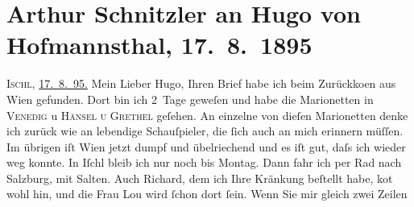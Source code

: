 

         
         \renewcommand{\erwaehntePersonen}{Personen: Lou Andreas-Salomé, Richard Beer-Hofmann, Paul Goldmann, Hugo von Hofmannsthal, Fedor Mamroth, Felix Salten}
         \renewcommand{\erwaehnteOrte}{Orte: Bad Ischl, Hodonín, München, Salzburg, Venedig in Wien, Wien}
         \renewcommand{\erwaehnteWerke}{Werke: Die Frau des Weisen. Erzählung, Ein Abschied, Freiwild. Schauspiel in 3 Akten, Hänsel und Grethel}
               \section[Arthur Schnitzler an Hugo von Hofmannsthal, 17. 8. 1895]{ Arthur Schnitzler an Hugo von Hofmannsthal, 17. 8. 1895}\nopagebreak{}\rehead{ }\begin{ledgroupsized}[t]{13cm}\normalsize\beginnumbering \toendnotes[C]{\smallbreak\pagebreak[2]} 
\toendnotes[C]{\smallbreak}\pstart
           \raggedleft{}{\pb}\textsc{Ischl}, \uline{17. 8. 95.}\pend
           \pstart
           Mein Lieber Hugo, Ihren Brief habe ich beim Zurückko{\geminationm}en aus Wien
                    gefunden. Dort bin ich 2 Tage geweſen und habe die Marionetten in \textsc{Venedig} u \textsc{Hänsel u Grethel} geſehen. An einzelne von dieſen Marionetten denke ich zurück wie an
                    lebendige Schauſpieler, die ſich auch an mich erinnern müſſen. Im übrigen iſt
                        Wien jetzt dumpf und übelriechend und es
                    iſt gut, daſs ich wieder weg konnte. In Iſchl bleib ich nur noch bis Montag. Dann fahr ich per Rad nach
                        Salzburg, mit Salten. {\pb}Auch Richard, dem ich Ihre Kränkung beſtellt habe, ko{\geminationm}t wohl hin, und die Frau Lou wird ſchon dort ſein. Wenn Sie mir gleich zwei Zeilen

\end{ledgroupsized}

